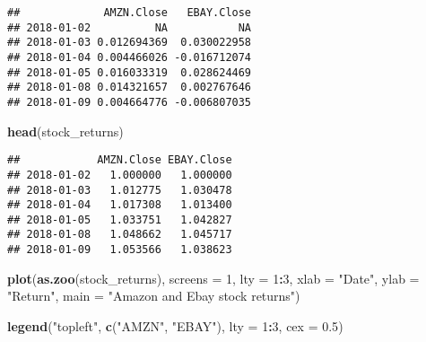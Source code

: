 \documentclass[]{article}
\newenvironment{Shaded}{\begin{snugshade}}{\end{snugshade}}
\newcommand{\KeywordTok}[1]{\textcolor[rgb]{0.13,0.29,0.53}{\textbf{#1}}}
\newcommand{\DataTypeTok}[1]{\textcolor[rgb]{0.13,0.29,0.53}{#1}}
\newcommand{\DecValTok}[1]{\textcolor[rgb]{0.00,0.00,0.81}{#1}}
\newcommand{\FloatTok}[1]{\textcolor[rgb]{0.00,0.00,0.81}{#1}}
\newcommand{\StringTok}[1]{\textcolor[rgb]{0.31,0.60,0.02}{#1}}
\newcommand{\CommentTok}[1]{\textcolor[rgb]{0.56,0.35,0.01}{\textit{#1}}}
\newcommand{\ControlFlowTok}[1]{\textcolor[rgb]{0.13,0.29,0.53}{\textbf{#1}}}
\newcommand{\OperatorTok}[1]{\textcolor[rgb]{0.81,0.36,0.00}{\textbf{#1}}}
\newcommand{\NormalTok}[1]{#1}
\begin{document}
\begin{Shaded}
\end{Shaded}

\begin{verbatim}
##             AMZN.Close   EBAY.Close
## 2018-01-02          NA           NA
## 2018-01-03 0.012694369  0.030022958
## 2018-01-04 0.004466026 -0.016712074
## 2018-01-05 0.016033319  0.028624469
## 2018-01-08 0.014321657  0.002767646
## 2018-01-09 0.004664776 -0.006807035
\end{verbatim}

\begin{Shaded}
\begin{Highlighting}[]
\KeywordTok{head}\NormalTok{(stock_returns)}
\end{Highlighting}
\end{Shaded}

\begin{verbatim}
##            AMZN.Close EBAY.Close
## 2018-01-02   1.000000   1.000000
## 2018-01-03   1.012775   1.030478
## 2018-01-04   1.017308   1.013400
## 2018-01-05   1.033751   1.042827
## 2018-01-08   1.048662   1.045717
## 2018-01-09   1.053566   1.038623
\end{verbatim}

\begin{Shaded}
\begin{Highlighting}[]
\KeywordTok{plot}\NormalTok{(}\KeywordTok{as.zoo}\NormalTok{(stock_returns), }\DataTypeTok{screens =} \DecValTok{1}\NormalTok{, }\DataTypeTok{lty =} \DecValTok{1}\OperatorTok{:}\DecValTok{3}\NormalTok{, }\DataTypeTok{xlab =} \StringTok{"Date"}\NormalTok{, }\DataTypeTok{ylab =} \StringTok{"Return"}\NormalTok{, }\DataTypeTok{main =} \StringTok{"Amazon and Ebay stock returns"}\NormalTok{)}

\KeywordTok{legend}\NormalTok{(}\StringTok{"topleft"}\NormalTok{, }\KeywordTok{c}\NormalTok{(}\StringTok{"AMZN"}\NormalTok{, }\StringTok{"EBAY"}\NormalTok{), }\DataTypeTok{lty =} \DecValTok{1}\OperatorTok{:}\DecValTok{3}\NormalTok{, }\DataTypeTok{cex =} \FloatTok{0.5}\NormalTok{)}
\end{Highlighting}
\end{Shaded}
\end{document}
